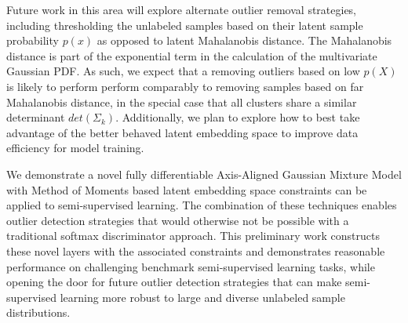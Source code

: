 \documentclass[10pt,twocolumn,letterpaper]{article}
\begin{document}
Future work in this area will explore alternate outlier removal strategies, including thresholding the unlabeled samples based on their latent sample probability $p(x)$ as opposed to latent Mahalanobis distance.  
The Mahalanobis distance is part of the exponential term in the calculation of the multivariate Gaussian PDF. 
As such, we expect that a removing outliers based on low $p(X)$ is likely to perform perform comparably to removing samples based on far Mahalanobis distance, in the special case that all clusters share a similar determinant $det\left(\Sigma_k \right)$.  
Additionally, we plan to explore how to best take advantage of the better behaved latent embedding space to improve data efficiency for model training. 

We demonstrate a novel fully differentiable Axis-Aligned Gaussian Mixture Model with Method of Moments based latent embedding space constraints can be applied to semi-supervised learning.  
The combination of these techniques enables outlier detection strategies that would otherwise not be possible with a traditional softmax discriminator approach.
This preliminary work constructs these novel layers with the associated constraints and demonstrates reasonable performance on challenging benchmark semi-supervised learning tasks, while opening the door for future outlier detection strategies that can make semi-supervised learning more robust to large and diverse unlabeled sample distributions.



{
	\small
	
	
}
\end{document}
